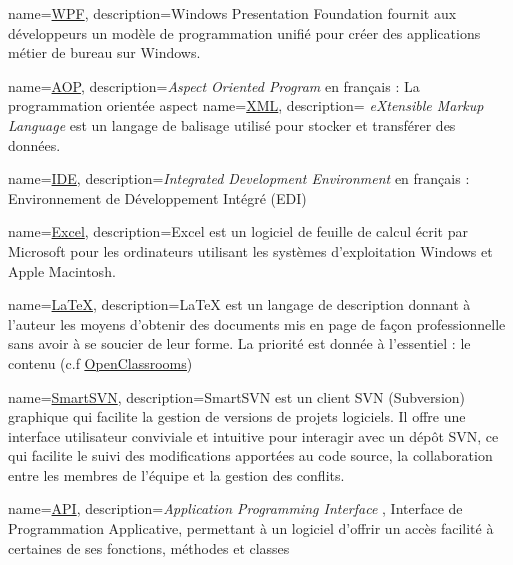 \usepackage[toc,section=chapter]{glossaries}    %

\makeglossaries

{
	name=\underline{WPF},
	description={Windows Presentation Foundation fournit aux développeurs un modèle de programmation unifié pour créer des applications métier de bureau sur Windows.}
}

{
	name=\underline{AOP},
	description={\textit{Aspect Oriented Program} en français :  La programmation orientée aspect }
}
{
	name=\underline{XML},
	description={ \textit{eXtensible Markup Language} est un langage de balisage utilisé pour stocker et transférer des données.}
}

{
	name=\underline{IDE},
	description={\textit{Integrated Development Environment} en français :  Environnement de Développement Intégré (EDI) }
}

{
	name=\underline{Excel},
	description={Excel est un logiciel de feuille de calcul écrit par Microsoft pour les ordinateurs utilisant les systèmes d'exploitation Windows et Apple Macintosh.}
}

{
	name=\underline{LaTeX},
	description={LaTeX est un langage de description donnant à l'auteur les moyens d'obtenir des documents mis en page de façon professionnelle sans avoir à se soucier de leur forme. La priorité est donnée à l'essentiel : le contenu (c.f \underline{\href{https://openclassrooms.com/fr/courses/1617396-redigez-des-documents-de-qualite-avec-latex/1617565-quest-ce-que-latex}{OpenClassrooms}})}
}

{
	name=\underline{SmartSVN},
	description={SmartSVN est un client SVN (Subversion) graphique qui facilite la gestion de versions de projets logiciels. Il offre une interface utilisateur conviviale et intuitive pour interagir avec un dépôt SVN, ce qui facilite le suivi des modifications apportées au code source, la collaboration entre les membres de l'équipe et la gestion des conflits.}
}


{
	name=\underline{API},
	description={\textit{Application Programming Interface }, Interface de Programmation Applicative, permettant à un logiciel d'offrir un accès facilité à certaines de ses fonctions, méthodes et classes}
}

